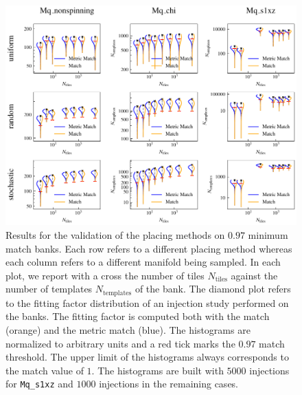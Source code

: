\documentclass[twocolumn,showpacs,preprintnumbers,nofootinbib,prd,
superscriptaddress,10pt]{revtex4-2}
\begin{document}
\begin{figure}[th!]
	\centering
	\includegraphics[width=.75\textwidth,keepaspectratio]{placing_validation}
	\caption{Results for the validation of the placing methods on $0.97$ minimum match banks. Each row refers to a different placing method whereas each column refers to a different manifold being sampled. In each plot, we report with a cross the number of tiles $N_{\text{tiles}}$ against the number of templates $N_{\text{templates}}$ of the bank.
	The diamond plot refers to the fitting factor distribution of an injection study performed on the banks. The fitting factor is computed both with the match (orange) and the metric match (blue). The histograms are normalized to arbitrary units and a red tick marks the $0.97$ match threshold. The upper limit of the histograms always corresponds to the match value of $1$.
	The histograms are built with $5000$ injections for \texttt{Mq\_s1xz} and $1000$ injections in the remaining cases.
	}
	\label{fig:placing_validation}
\end{figure}
\end{document}
